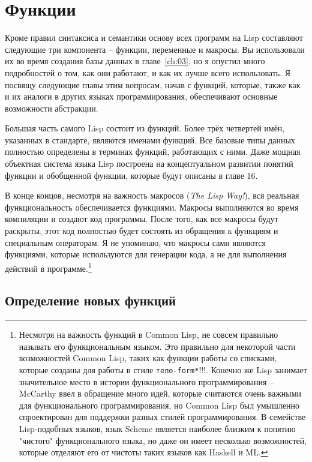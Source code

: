 \chapter{Функции}
\label{ch:05}

Кроме правил синтаксиса и семантики основу всех программ на Lisp составляют следующие три
компонента -- функции, переменные и макросы.  Вы использовали их во время создания базы
данных в главе~\ref{ch:03}, но я опустил много подробностей о том, как они работают, и как
их лучше всего использовать.  Я посвящу следующие главы этим вопросам, начав с функций,
которые, также как и их аналоги в других языках программирования, обеспечивают основные
возможности абстракции.

Большая часть самого Lisp состоит из функций.  Более трёх четвертей имён, указанных в
стандарте, являются именами функций.  Все базовые типы данных полностью определены в
терминах функций, работающих с ними. Даже мощная объектная система языка Lisp построена на
концептуальном развитии понятий функции и обобщенной функции, которые будут описаны в
главе 16.

В конце концов, несмотря на важность макросов (\textit{The Lisp Way!}), вся реальная
функциональность обеспечивается функциями.  Макросы выполняются во время компиляции и
создают код программы. После того, как все макросы будут раскрыты, этот код полностью
будет состоять из обращения к функциям и специальным операторам.  Я не упоминаю, что
макросы сами являются функциями, которые используются для генерации кода, а не для
выполнения действий в программе.\footnote{Несмотря на важность функций в Common Lisp, не
  совсем правильно называть его функциональным языком.  Это правильно для некоторой части
  возможностей Common Lisp, таких как функции работы со списками, которые созданы для
  работы в стиле \lstinline{тело-form*}!!!. Конечно же Lisp занимает значительное место в
  истории функционального программирования -- McCarthy ввел в обращение много идей,
  которые считаются очень важными для функционального программирования, но Common Lisp был
  умышленно спроектирован для поддержки разных стилей программирования.  В семействе
  Lisp-подобных языков, язык Scheme является наиболее близким к понятию "чистого"
  функционального языка, но даже он имеет несколько возможностей, которые отделяют его от
  чистоты таких языков как Haskell и ML.}

\section{Определение новых функций}

